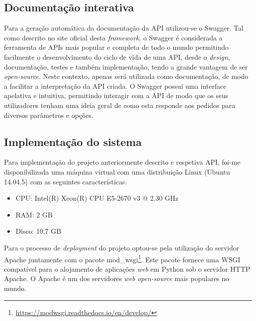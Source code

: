 \subsection{Documentação interativa}


Para a geração automática da documentação da \ac{API} utilizou-se o Swagger. Tal como descrito no site oficial desta \textit{framework}\cite{SmartBearSoftware2017}, o Swagger é considerada a ferramenta de APIs mais popular e completa de todo o mundo permitindo facilmente o desenvolvimento do ciclo de vida de uma \ac{API}, desde o \textit{design}, documentação, testes e também implementação, tendo a grande vantagem de ser \textit{open-source}. Neste contexto, apenas será utilizada como documentação, de modo a facilitar a interpretação da \ac{API} criada. O Swagger possui uma interface apelativa e intuitiva, permitindo interagir com a \ac{API} de modo que os seus utilizadores tenham uma ideia geral de como esta responde aos pedidos para diversos parâmetros e opções. 





\subsection{Implementação do sistema}

Para implementação do projeto anteriormente descrito e respetiva API, foi-me disponibilizada uma máquina virtual com uma distribuição Linux (Ubuntu 14.04.5) com as seguintes características: 

\begin{itemize}
	\item \ac{CPU}: Intel(R) Xeon(R) CPU E5-2670 v3 @ 2.30 GHz
	\item \ac{RAM}: 2 GB
	\item Disco: 10.7 GB
\end{itemize}


Para o processo de \textit{deployment} do projeto optou-se pela utilização do servidor Apache juntamente com o pacote mod\_wsgi\footnote{\url{https://modwsgi.readthedocs.io/en/develop/}}. 
Este pacote fornece uma \ac{WSGI} compatível para o alojamento de aplicações \textit{web} em Python sob o servidor \ac{HTTP} Apache. O Apache é um dos servidores \textit{web} \textit{open-source} mais  populares no mundo\cite{TheApacheSoftwareFoundation2016}.







